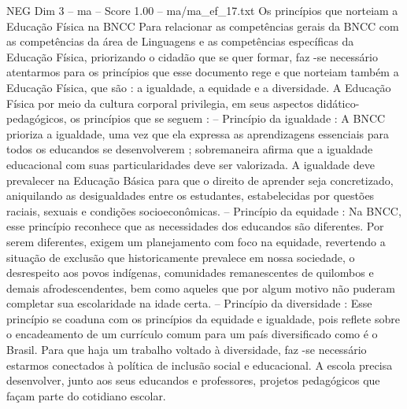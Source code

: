 \begin{textsample}{NEG Dim 3 – ma – Score 1.00 – ma/ma\_ef\_17.txt}  \label{ex:f3_neg_141}
Os princípios que norteiam a Educação Física na BNCC Para relacionar as competências gerais da BNCC com as competências da área de Linguagens e as competências específicas da Educação Física, priorizando o cidadão que se quer formar, faz -se necessário atentarmos para os princípios que esse documento rege e que norteiam também a Educação Física, que são : a igualdade, a equidade e a diversidade.
A Educação Física por meio da cultura corporal privilegia, em seus aspectos didático-pedagógicos, os princípios que se seguem : – Princípio da igualdade : A BNCC prioriza a igualdade, uma vez que ela expressa as aprendizagens essenciais para todos os educandos se desenvolverem ; sobremaneira afirma que a igualdade educacional com suas particularidades deve ser valorizada.
A igualdade deve prevalecer na Educação Básica para que o direito de aprender seja concretizado, aniquilando as desigualdades entre os estudantes, estabelecidas por questões raciais, sexuais e condições socioeconômicas. – Princípio da equidade : Na BNCC, esse princípio reconhece que as necessidades dos educandos são diferentes.
Por serem diferentes, exigem um planejamento com foco na equidade, revertendo a situação de exclusão que historicamente prevalece em nossa sociedade, o desrespeito aos povos indígenas, comunidades remanescentes de quilombos e demais afrodescendentes, bem como aqueles que por algum motivo não puderam completar sua escolaridade na idade certa. – Princípio da diversidade : Esse princípio se coaduna com os princípios da equidade e igualdade, pois reflete sobre o encadeamento de um currículo comum para um país diversificado como é o Brasil.
Para que haja um trabalho voltado à diversidade, faz -se necessário estarmos conectados à política de inclusão social e educacional.
A escola precisa desenvolver, junto aos seus educandos e professores, projetos pedagógicos que façam parte do cotidiano escolar.

\end{textsample}
